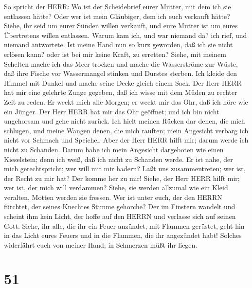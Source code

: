  So spricht der HERR: Wo ist der Scheidebrief eurer Mutter,
mit dem ich sie entlassen hätte? Oder wer ist mein Gläubiger, dem ich
euch verkauft hätte? Siehe, ihr seid um eurer Sünden willen verkauft,
und eure Mutter ist um eures Übertretens willen entlassen. 
Warum kam ich, und war niemand da? ich rief, und niemand antwortete. Ist
meine Hand nun so kurz geworden, daß ich sie nicht erlösen kann? oder
ist bei mir keine Kraft, zu erretten? Siehe, mit meinem Schelten mache
ich das Meer trocken und mache die Wasserströme zur Wüste, daß ihre
Fische vor Wassermangel stinken und Durstes sterben.  Ich
kleide den Himmel mit Dunkel und mache seine Decke gleich einem Sack.
 Der Herr HERR hat mir eine gelehrte Zunge gegeben, daß ich
wisse mit dem Müden zu rechter Zeit zu reden. Er weckt mich alle Morgen;
er weckt mir das Ohr, daß ich höre wie ein Jünger.  Der Herr
HERR hat mir das Ohr geöffnet; und ich bin nicht ungehorsam und gehe
nicht zurück.  Ich hielt meinen Rücken dar denen, die mich
schlugen, und meine Wangen denen, die mich rauften; mein Angesicht
verbarg ich nicht vor Schmach und Speichel.  Aber der Herr
HERR hilft mir; darum werde ich nicht zu Schanden. Darum habe ich mein
Angesicht dargeboten wie einen Kieselstein; denn ich weiß, daß ich nicht
zu Schanden werde.  Er ist nahe, der mich gerechtspricht;
wer will mit mir hadern? Laßt uns zusammentreten; wer ist, der Recht zu
mir hat? Der komme her zu mir!  Siehe, der Herr HERR hilft
mir; wer ist, der mich will verdammen? Siehe, sie werden allzumal wie
ein Kleid veralten, Motten werden sie fressen.  Wer ist
unter euch, der den HERRN fürchtet, der seines Knechtes Stimme gehorche?
Der im Finstern wandelt und scheint ihm kein Licht, der hoffe auf den
HERRN und verlasse sich auf seinen Gott.  Siehe, ihr alle,
die ihr ein Feuer anzündet, mit Flammen gerüstet, geht hin in das Licht
eures Feuers und in die Flammen, die ihr angezündet habt! Solches
widerfährt euch von meiner Hand; in Schmerzen müßt ihr liegen.

\hypertarget{section-50}{%
\section{51}\label{section-50}}

